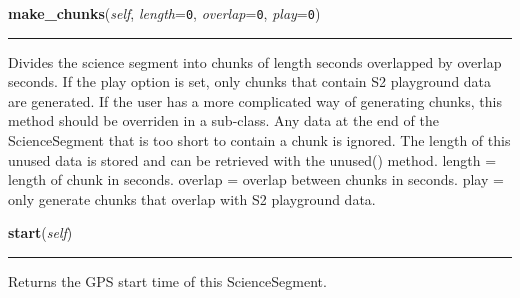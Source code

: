    \label{pipeline:ScienceSegment:make_chunks}
    \vspace{0.5ex}

    \noindent\begin{boxedminipage}{\textwidth}

    \raggedright \textbf{make\_chunks}(\textit{self}, \textit{length}=\texttt{0\-}, \textit{overlap}=\texttt{0\-}, \textit{play}=\texttt{0\-})

    \vspace{-1.5ex}

    \rule{\textwidth}{0.5\fboxrule}
    Divides the science segment into chunks of length seconds overlapped 
    by overlap seconds. If the play option is set, only chunks that 
    contain S2 playground data are generated. If the user has a more 
    complicated way of generating chunks, this method should be overriden 
    in a sub-class. Any data at the end of the ScienceSegment that is too 
    short to contain a chunk is ignored. The length of this unused data 
    is stored and can be retrieved with the unused() method. length = 
    length of chunk in seconds. overlap = overlap between chunks in 
    seconds. play = only generate chunks that overlap with S2 playground 
    data.

    \vspace{1ex}

    \end{boxedminipage}

    \label{pipeline:ScienceSegment:start}
    \vspace{0.5ex}

    \noindent\begin{boxedminipage}{\textwidth}

    \raggedright \textbf{start}(\textit{self})

    \vspace{-1.5ex}

    \rule{\textwidth}{0.5\fboxrule}
    Returns the GPS start time of this ScienceSegment.

    \vspace{1ex}

    \end{boxedminipage}

    \label{pipeline:ScienceSegment:unused}
    \vspace{0.5ex}

